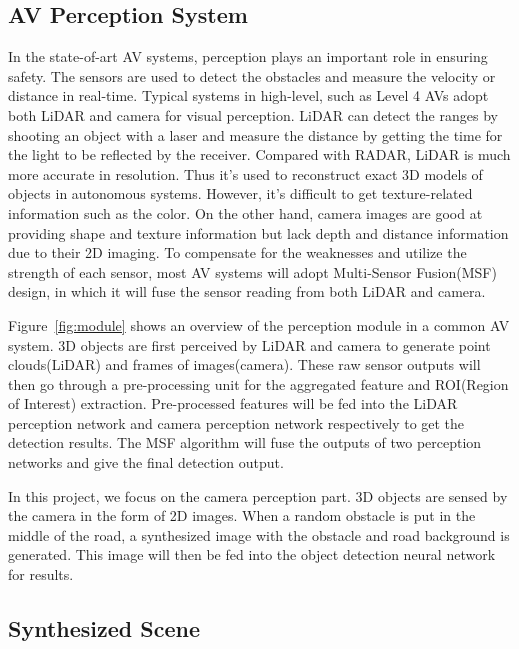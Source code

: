 
\subsection{AV Perception System}

In the state-of-art AV systems, perception plays an important role in ensuring safety. 
The sensors are used to detect the obstacles and measure the velocity or distance in real-time. 
Typical systems in high-level, such as Level 4\cite{level4} AVs adopt both LiDAR and camera for visual perception.
LiDAR\cite{lidar} can detect the ranges by shooting an object with a laser and measure the distance by getting the time for the light to be reflected by the receiver.
Compared with RADAR, LiDAR is much more accurate in resolution.
Thus it's used to reconstruct exact 3D models of objects in autonomous systems.
However, it's difficult to get texture-related information such as the color\cite{lidar-text}. 
On the other hand, camera images are good at providing shape and texture information but lack depth and distance information due to their 2D imaging.
To compensate for the weaknesses and utilize the strength of each sensor, most AV systems will adopt Multi-Sensor Fusion(MSF) design, 
in which it will fuse the sensor reading from both LiDAR and camera.

Figure~\ref{fig:module} shows an overview of the perception module in a common AV system\cite{apollo}.
3D objects are first perceived by LiDAR and camera to generate point clouds(LiDAR) and frames of images(camera).
These raw sensor outputs will then go through a pre-processing unit for the aggregated feature and ROI(Region of Interest) extraction.
Pre-processed features will be fed into the LiDAR perception network and camera perception network respectively to get the detection results.
The MSF algorithm will fuse the outputs of two perception networks and give the final detection output.

In this project, we focus on the camera perception part. 
3D objects are sensed by the camera in the form of 2D images. 
When a random obstacle is put in the middle of the road, a synthesized image with the obstacle and road background is generated.
This image will then be fed into the object detection neural network for results.

\subsection{Synthesized Scene}

